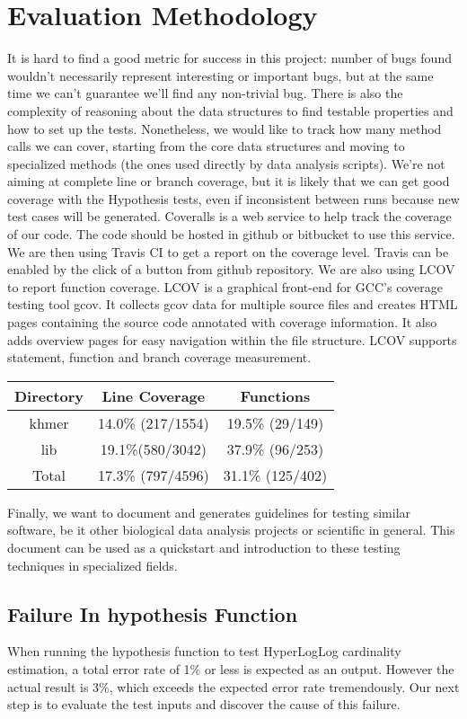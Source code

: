 \documentclass[preprint,nocopyrightspace]{sig-alternate}
\begin{document}
\section{Evaluation Methodology}
It is hard to find a good metric for success in this project:
number of bugs found wouldn't necessarily represent interesting or important bugs,
but at the same time we can't guarantee we'll find any non-trivial bug.
There is also the complexity of reasoning about the data structures to find testable properties and how to set up the tests.
Nonetheless,
we would like to track how many method calls we can cover,
starting from the core data structures and moving to specialized methods (the ones used directly by data analysis scripts).
We're not aiming at complete line or branch coverage,
but it is likely that we can get good coverage with the Hypothesis tests,
even if inconsistent between runs because new test cases will be generated.
Coveralls is a web service to help track the coverage of our code.
The code should be hosted in github or bitbucket to use this service.
We are then using Travis CI to get a report on the coverage level.
Travis can be enabled by the click of a button from github repository.
We are also using LCOV to report function coverage. 
LCOV is a graphical front-end for GCC's coverage testing tool gcov. 
It collects gcov data for multiple source files and creates HTML pages containing the 
source code annotated with coverage information. 
It also adds overview pages for easy navigation within the file structure. 
LCOV supports statement, function and branch coverage measurement.
\begin{center}
\begin{tabular}{ |c|c|c| } 
 \hline
 Directory & Line Coverage & Functions \\ 
 \hline
 khmer & 14.0\% (217/1554) & 19.5\% (29/149) \\ 
 \hline
 lib & 19.1\%(580/3042) & 37.9\% (96/253) \\ 
 \hline
 Total & 17.3\% (797/4596) & 31.1\% (125/402) \\
 \hline
\end{tabular}
\end{center}
Finally,
we want to document and generates guidelines for testing similar software,
be it other biological data analysis projects or scientific in general.
This document can be used as a quickstart and introduction to these testing techniques in specialized fields.

\subsection{Failure In hypothesis Function}
When running the hypothesis function to test HyperLogLog cardinality estimation, 
a total error rate of 1\% or less is expected as an output. 
However the actual result is 3\%, 
which exceeds the expected error rate tremendously. 
Our next step is to evaluate the test inputs and discover the cause of this failure.
\end{document}
